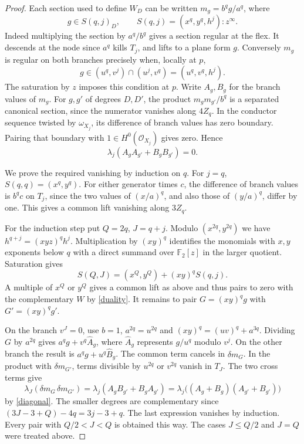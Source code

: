 \documentclass[11pt,a4paper,reqno]{amsart}
\numberwithin{equation}{section}
\theoremstyle{plain}
\newcommand{\OO}{\mathcal O}
\begin{document}
\begin{proof}
Each section used to define $W_D$ can be written $m_g=b^qg/a^q$, where
\[
 g\in S(q,j)_D,\qquad S(q,j)=(x^q,y^q,h^j):z^\infty .
\]
Indeed multiplying the section by $a^q/b^q$ gives a section regular at the flex. It descends at the node since $a^q$ kills $T_j$, and lifts to a plane form $g$. Conversely $m_g$ is regular on both branches precisely when, locally at $p$,
\[
 g\in(u^q,v^j)\cap(u^j,v^q)=(u^q,v^q,h^j).
\]
The saturation by $z$ imposes this condition at $p$. Write $A_g,B_g$ for the branch values of $m_g$. For $g,g'$ of degrees $D,D'$, the product $m_gm_{g'}/b^q$ is a separated canonical section, since the numerator vanishes along $4Z_q$. In the conductor sequence twisted by $\omega_{X_j}$, its difference of branch values has zero boundary. Pairing that boundary with $1\in H^0(\OO_{X_j})$ gives zero. Hence
\begin{equation}\label{diagonal}
 \lambda_j(A_gA_{g'}+B_gB_{g'})=0 .
\end{equation}

We prove the required vanishing by induction on $q$. For $j=q$, $S(q,q)=(x^q,y^q)$. For either generator times $c$, the difference of branch values is $b^q c$ on $T_j$, since the two values of $(x/a)^q$, and also those of $(y/a)^q$, differ by one. This gives a common lift vanishing along $3Z_q$.

For the induction step put $Q=2q$, $J=q+j$. Modulo $(x^{2q},y^{2q})$ we have $h^{q+j}=(xyz)^q h^j$. Multiplication by $(xy)^q$ identifies the monomials with $x,y$ exponents below $q$ with a direct summand over $\mathbb F_2[z]$ in the larger quotient. Saturation gives
\[
 S(Q,J)=(x^Q,y^Q)+(xy)^q S(q,j).
\]
A multiple of $x^Q$ or $y^Q$ gives a common lift as above and thus pairs to zero with the complementary $W$ by \eqref{duality}. It remains to pair $G=(xy)^qg$ with $G'=(xy)^qg'$.

On the branch $v^J=0$, use $b=1$, $a^{2q}=u^{2q}$ and $(xy)^q=(uv)^q+a^{3q}$. Dividing $G$ by $a^{2q}$ gives $a^qg+v^q\widehat A_g$, where $\widehat A_g$ represents $g/u^q$ modulo $v^j$. On the other branch the result is $a^qg+u^q\widehat B_g$. The common term cancels in $\delta m_G$. In the product with $\delta m_{G'}$, terms divisible by $u^{2q}$ or $v^{2q}$ vanish in $T_J$. The two cross terms give
\[
 \lambda_J(\delta m_G\,\delta m_{G'})
 =\lambda_j(A_gB_{g'}+B_gA_{g'})
 =\lambda_j\big((A_g+B_g)(A_{g'}+B_{g'})\big)
\]
by \eqref{diagonal}. The smaller degrees are complementary since $(3J-3+Q)-4q=3j-3+q$. The last expression vanishes by induction. Every pair with $Q/2<J<Q$ is obtained this way. The cases $J\le Q/2$ and $J=Q$ were treated above.
\end{proof}
\end{document}
